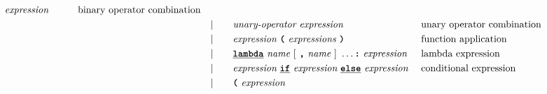 \begin{alignat*}{9}
                                            \textit{expression} \qquad
                                                           && \textrm{binary operator combination}\\
&&                       && |   &\quad &&   \textit{unary-operator} \ 
                                            \textit{expression}
                                                           && \textrm{unary operator combination}\\
&&                       && |   &\quad &&   \textit{expression} \ 
                                            \textbf{\texttt{(}}\ \textit{expressions}\
                                            \textbf{\texttt{)}}
                                                           && \textrm{function application}\\
&&                       && |   &\quad &&   \textbf{\texttt{\underline{lambda}}} \ 
                                            \textit{name} \ 
                                                   [\ \textbf{\texttt{,}} \ \textit{name}\ ]\ \ldots
                                            \texttt{\textbf{:}}\ \textit{expression}
                                                           && \textrm{lambda expression}\\
&&                       && |   &\quad &&   \textit{expression} \ \textbf{\texttt{\underline{if}}} \ \textit{expression} \ 
                                            \textbf{\texttt{\underline{else}}} \ \textit{expression} \ 
                                                           && \textrm{conditional expression}\\
&&                       && |   &\quad &&  \textbf{\texttt{(}}\  \textit{expression} \ 

\end{alignat*}
